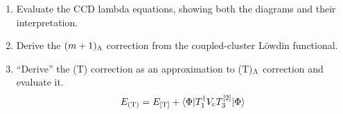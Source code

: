 \documentclass[11pt]{article}
\begin{document}
\begin{enumerate}
\item
Evaluate the CCD lambda equations, showing both the diagrams and their interpretation.

\setcounter{enumi}{12}
\item
Derive the $(m+1)_{\Lambda }$ correction from the coupled-cluster L\"owdin functional.

\item
``Derive'' the (T) correction as an approximation to (T)$_{\Lambda }$ correction and evaluate it.
\begin{align}
  E_{(\mathrm{T})}
=
  E_{[\mathrm{T}]}
+
  \langle\Phi |
    T_1^\dagger
    V_{\mathrm{c}}
    T_3^{[2]}
  |\Phi \rangle
\end{align}


\end{enumerate}
\end{document}
